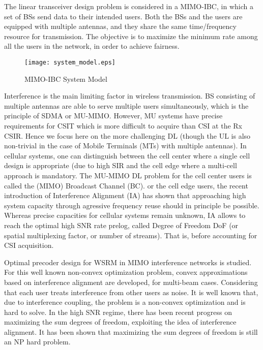 The linear transceiver design problem is considered in a \ac{MIMO}-\ac{IBC}, in which a set of \ac{BS}s send data to their intended users. Both the \ac{BS}s and the users are equipped with multiple antennas, and they share the same time/frequency resource for transmission. The objective is to maximize the minimum rate among all the users in the network, in order to achieve fairness.

\begin{figure}[h]
	\begin{center}
		\texttt{[image: system\_model.eps]}
		\caption{MIMO-IBC System Model}
	\end{center}
\end{figure}

Interference is the main limiting factor in wireless transmission. \ac{BS} consisting of multiple antennas are able to serve multiple users simultaneously, which is the principle of \ac{SDMA} or \ac{MU-MIMO}. However, \ac{MU} systems have precise requirements for \ac{CSIT} which is more difficult to acquire than \ac{CSI} at the Rx \ac{CSIR}. Hence we focus here on the more challenging \ac{DL} (though the \ac{UL} is also non-trivial in the case of Mobile Terminals (MTs) with multiple antennas). In cellular systems, one can distinguish between the cell center where a single cell design is appropriate (due to high \ac{SIR} and the cell edge where a multi-cell approach is mandatory. The \ac{MU-MIMO} \ac{DL} problem for the cell center users is called the (MIMO) Broadcast Channel (BC). or the cell edge users,  the recent introduction of Interference Alignment (IA) has shown that approaching high system capacity through agressive frequency reuse should in principle be possible.  Whereas precise capacities for cellular systems remain unknown, IA allows to reach the optimal high \ac{SNR} rate prelog, called Degree of Freedom \ac{DoF} (or spatial multiplexing factor, or number of streams). That is, before accounting for \ac{CSI} acquisition.  

Optimal  precoder  design  for  \ac{WSRM} in \ac{MIMO} interference networks  is  studied.  For  this  well  known  non-convex  optimization problem, convex approximations based on interference alignment are developed, for multi-beam cases. Considering that each user treats interference from other users as noise. It is well known that, due to interference coupling, the problem is a non-convex optimization and is hard to solve. In the high \ac{SNR} regime, there has been recent progress on maximizing the sum degrees of freedom, exploiting the idea of interference alignment. It has been shown that maximizing the sum degrees of freedom is  still  an  NP  hard  problem. 



